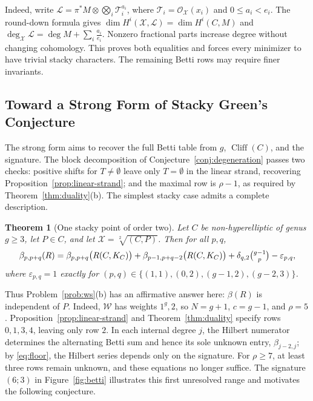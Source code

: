 \documentclass[11pt,reqno]{amsart}
\newtheorem{theorem}[lemma]{Theorem}
\theoremstyle{remark}
\newcommand{\cliff}{\operatorname{Cliff}}
\newcommand{\cL}{\mathcal{L}}
\newcommand{\cO}{\mathcal{O}}
\newcommand{\cT}{\mathcal{T}}
\newcommand{\cW}{\mathcal{W}}
\newcommand{\cX}{\mathcal{X}}
\begin{document}
Indeed, write $\cL=\pi^*M\otimes\bigotimes_i\cT_i^{a_i}$, where $\cT_i=\cO_{\cX}(x_i)$ and $0\leq a_i<e_i$. The round-down formula gives $\dim H^i(\cX,\cL)=\dim H^i(C,M)$ and $\deg_{\cX}\cL=\deg M+\sum_i\frac{a_i}{e_i}$. Nonzero fractional parts increase degree without changing cohomology. This proves both equalities and forces every minimizer to have trivial stacky characters. The remaining Betti rows may require finer invariants.


\subsection{Toward a Strong Form of Stacky Green's Conjecture}\label{subsec:middle}
The strong form aims to recover the full Betti table from $g$, $\cliff(C)$, and the signature. The block decomposition of Conjecture~\ref{conj:degeneration} passes two checks: positive shifts for $T\neq\emptyset$ leave only $T=\emptyset$ in the linear strand, recovering Proposition~\ref{prop:linear-strand}; and the maximal row is $\rho-1$, as required by Theorem~\ref{thm:duality}(b). The simplest stacky case admits a complete description.

\begin{theorem}[One stacky point of order two]\label{thm:order-two}
Let $C$ be non-hyperelliptic of genus $g\geq3$, let $P\in C$, and let $\cX=\sqrt[2]{(C,P)}$. Then for all $p,q$,
\[
\beta_{p,p+q}(R)
=\beta_{p,p+q}\big(R(C,K_C)\big)
+\beta_{p-1,p+q-2}\big(R(C,K_C)\big)
+\delta_{q,2}\tbinom{g-1}{p}
-\varepsilon_{p,q},
\]
where $\varepsilon_{p,q}=1$ exactly for
$(p,q)\in\{(1,1),(0,2),(g-1,2),(g-2,3)\}$.
\end{theorem}

Thus Problem~\ref{prob:ws}(b) has an affirmative answer here: $\beta(R)$ is independent of $P$. Indeed, $\cW$ has weights $1^g,2$, so $N=g+1$, $c=g-1$, and $\rho=5$. Proposition~\ref{prop:linear-strand} and Theorem~\ref{thm:duality} specify rows $0,1,3,4$, leaving only row $2$. In each internal degree $j$, the Hilbert numerator determines the alternating Betti sum and hence its sole unknown entry, $\beta_{j-2,j}$; by \eqref{eq:floor}, the Hilbert series depends only on the signature. For $\rho\geq7$, at least three rows remain unknown, and these equations no longer suffice. The signature $(6;3)$ in Figure~\ref{fig:betti} illustrates this first unresolved range and motivates the following conjecture.
\end{document}
